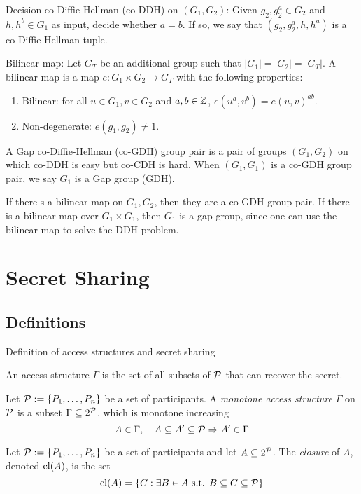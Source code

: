  Decision co-Diffie-Hellman (co-DDH) on $(G_1, G_2)$: Given $g_2, g^a_2 \in G_2$ and $h, h^b \in G_1$ as input, decide whether $a=b$. If so, we say that $(g_2, g^a_2, h, h^a)$ is a co-Diffie-Hellman tuple.

 Bilinear map: Let $G_T$ be an additional group such that $ |G_1| = |G_2| = |G_T| $. A bilinear map is a map $e: G_1 \times G_2 \rightarrow G_T$ with the following properties:
\begin{enumerate}

\item Bilinear: for all $u \in G_1, v \in G_2$ and $a,b \in {\mathbb Z}$, $e(u^a, v^b) = e(u,v)^{ab}$.
\item Non-degenerate: $e(g_1, g_2) \neq 1$.

\end{enumerate}

 A Gap co-Diffie-Hellman (co-GDH) group pair is a pair of groups $(G_1, G_2)$ on which co-DDH is easy but co-CDH is hard. When $(G_1, G_1)$ is a co-GDH group pair, we say $G_1$ is a Gap group (GDH).

\remk If there s a bilinear map on $G_1, G_2$, then they are a co-GDH group pair. If there is a bilinear map over $G_1 \times G_1$, then $G_1$ is a gap group, since one can use the bilinear map to solve the DDH problem.

\section{Secret Sharing}
\subsection{Definitions}
Definition of access structures and secret sharing

\cite{Phillips1992}
\cite{BlSt97}

 An access structure $\Gamma$ is the set of all subsets of ${\mathcal P}$ that can recover the secret.

 Let ${\mathcal P} := \{ P_1, \dots, P_n \}$ be a set of participants. A \textit{monotone access structure} $\Gamma$ on ${\mathcal P}$ is a subset $\Gamma \subseteq 2^{{\mathcal P}}$, which is monotone increasing $$ A \in \Gamma, \quad A \subseteq A' \subseteq {\mathcal P} \Rightarrow A' \in \Gamma $$

 Let ${\mathcal P} := \{ P_1, \dots, P_n \}$ be a set of participants and let $A \subseteq 2^{{\mathcal P}}$. The \textit{closure} of $A$, denoted $\text{cl} (A)$, is the set $$ \text{cl} (A) = \{ C: \exists B \in A \text{ s.t. } B \subseteq C \subseteq {\mathcal P} \}$$

